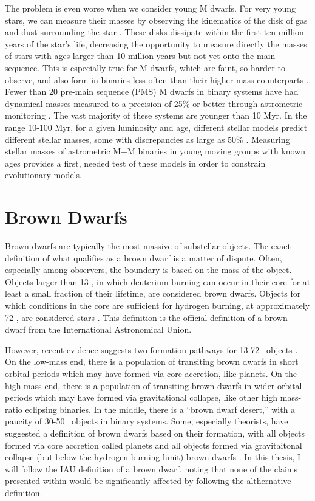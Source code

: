 The problem is even worse when we consider young M dwarfs.
For very young stars, we can measure their masses by observing the kinematics of
the disk of gas and dust surrounding the star \citep{Czekala15, Czekala16}.
These disks dissipate within the first ten million years of the star's life, decreasing the opportunity to measure directly the masses of stars with ages larger than 10 million years but not yet onto the main sequence. 
This is especially true for M dwarfs, which are faint, so harder to observe, and also 
form in binaries less often than their higher mass counterparts \citep{Fischer92, Shan15}.
Fewer than 20 pre-main sequence (PMS) M dwarfs in binary systems have had dynamical masses measured to a
precision of 25\% or better through astrometric monitoring \citep{Dupuy14}.
The vast majority of these systems are younger than 10 Myr.
In the range 10-100 Myr, for a given luminosity and age, different stellar models predict different stellar masses, some with discrepancies as large as 50\% \citep{Hillenbrand04,Schlieder14}.
Measuring stellar masses of astrometric M+M binaries in young moving groups with known 
ages provides a first, needed test of these models in order to constrain evolutionary models.

\section{Brown Dwarfs}
Brown dwarfs are typically the most massive of substellar objects. 
The exact definition of what qualifies as a brown dwarf is a matter of dispute.
Often, especially among observers, the boundary is based on the mass of the object.
Objects larger than 13 \mjup, in which deuterium burning can occur in their core for
at least a small fraction of their lifetime, are considered brown dwarfs.
Objects for which conditions in the core are sufficient for hydrogen burning, at approximately 
72 \mjup, are considered stars \citep{Zuckerman00}.
This definition is the official definition of a brown dwarf from the International
Astronomical Union.

However, recent evidence suggests two formation pathways for 13-72 \mjup\ objects
\citep{Bayliss16}. 
On the low-mass end, there is a population of transiting brown dwarfs in short orbital
periods which may have formed via core accretion, like planets.
On the high-mass end, there is a population of transiting brown dwarfs in wider orbital
periods which may have formed via gravitational collapse, like other high mass-ratio
eclipsing binaries.
In the middle, there is a ``brown dwarf desert,'' with a paucity of 30-50 \mjup\ objects in
binary systems.
Some, especially theorists, have suggested a definition of brown dwarfs based on their
formation, with all objects formed via core accretion called planets and all objects
formed via gravitaitonal collapse (but below the hydrogen burning limit) brown dwarfs
\citep[e.g.][]{Chabrier14}.
In this thesis, I will follow the IAU definition of a brown dwarf, noting that none of the
claims presented within would be significantly affected by following the althernative
definition.

